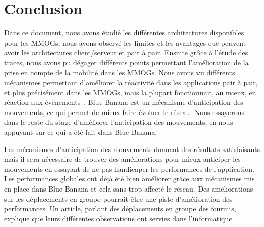 \section{Conclusion}
	Dans ce document, nous avons étudié les différentes architectures disponibles pour les MMOGs, nous avons observé les limites et les avantages que peuvent avoir les architectures client/serveur et pair à pair. Ensuite grâce à l'étude des traces, nous avons pu dégager différents points permettant l'amélioration de la prise en compte de la mobilité dans les MMOGs. Nous avons vu différents mécanismes permettant d'améliorer la réactivité dans les applications pair à pair, et plus précisément dans les MMOGs, mais la plupart fonctionnait, au mieux, en réaction aux évènements~\cite{10.1109/SRDS.2006.33}. Blue Banana est un mécanisme d'anticipation des mouvements, ce qui permet de mieux faire évoluer le réseau. Nous essayerons dans le reste du stage d'améliorer l'anticipation des mouvements, en nous appuyant sur ce qui a été fait dans Blue Banana.\\

	\par Les mécanismes d'anticipation des mouvements donnent des résultats satisfaisants mais il sera nécessaire de trouver des améliorations pour mieux anticiper les mouvements en essayant de ne pas handicaper les performances de l'application. Les performances globales ont déjà été bien améliorer grâce aux mécanismes mis en place dans Blue Banana et cela sans trop affecté le réseau. Des améliorations sur les déplacements en groupe pourrait être une piste d'amélioration des performances. Un  article, parlant des déplacements en groupe des fourmis, explique que leurs différentes observations ont servies dans l'informatique~\cite{fourmis}. 
		
